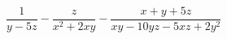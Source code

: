 \begin{ex}[type=expression]
	\begin{condition}
		\( \dfrac{1}{y-5z}-\dfrac{z}{x^2+2xy}-\dfrac{x+y+5z}{xy-10yz-5xz+2y^2} \)
	\end{condition}
\end{ex}